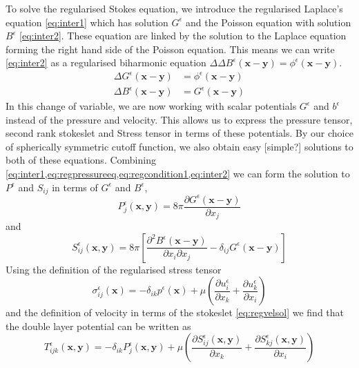 To solve the regularised Stokes equation, we introduce the regularised Laplace's equation \cref{eq:inter1} which has solution $G^\epsilon$ and the Poisson equation with solution $B^\epsilon$ \cref{eq:inter2}. These equation are linked by the solution to the Laplace equation forming the right hand side of the Poisson equation. This means we can write \cref{eq:inter2} as a regularised biharmonic equation $\Delta \Delta B^\epsilon  (\bm{x}-\bm{y}) = \phi^\epsilon(\bm{x}-\bm{y})$. 
\begin{subequations}
\label{eq:intermediate}
\begin{align}
    \Delta G^\epsilon(\bm{x}-\bm{y})  &= \phi^\epsilon(\bm{x}-\bm{y}) \label{eq:inter1} \\
    \Delta B^\epsilon(\bm{x}-\bm{y})  &= G^\epsilon(\bm{x}-\bm{y}) \label{eq:inter2}
\end{align}
\end{subequations}
In this change of variable, we are now working with scalar potentials $G^\epsilon$ and $b^\epsilon$ instead of the pressure and velocity. This allows us to express the pressure tensor, second rank stokeslet and Stress tensor in terms of these potentials. By our choice of spherically symmetric cutoff function, we also obtain easy [simple?] solutions to both of these equations. Combining \cref{eq:inter1,eq:regpressureeq,eq:regcondition1,eq:inter2} we can form the solution to $P^\epsilon$ and $S_{ij}$ in terms of $G^\epsilon$ and $B^\epsilon$,
\begin{equation}
\label{eq:pressuresol}
    P^\epsilon_{j}(\bm{x},\bm{y}) = 8 \pi \frac{\partial G^\epsilon(\bm{x}-\bm{y})}{\partial x_j}
\end{equation}
and
\begin{equation}
\label{eq:regstokeslet1}
    S_{ij}^\epsilon(\bm{x}, \bm{y}) = 8\pi\left[ \frac{\partial^2 B^\epsilon(\bm{x} -\bm{y})}{\partial x_i \partial x_j} - \delta_{ij}  G^\epsilon(\bm{x} -\bm{y})\right]
\end{equation}
Using the definition of the regularised stress tensor 
\begin{equation}
\label{eq:regstress}
    \sigma_{ij}^\epsilon(\bm{x}) = -\delta_{ik}p^\epsilon(\bm{x}) + \mu\left( \frac{\partial u^\epsilon_i}{\partial x_k} + \frac{\partial u^\epsilon_k}{\partial x_i} \right)
\end{equation}
and the definition of velocity in terms of the stokeslet \cref{eq:regvelsol} we find that the double layer potential can be written as 
\begin{equation}
\label{eq:regDoubleLayerSol}
    T^\epsilon_{ijk}(\bm{x},\bm{y}) = -\delta_{ik} P^\epsilon_j(\bm{x},\bm{y}) + \mu\left( \frac{\partial S^\epsilon_{ij}(\bm{x},\bm{y})}{\partial x_k} + \frac{\partial S^\epsilon_{kj}(\bm{x},\bm{y})}{\partial x_i}\right)
\end{equation}

